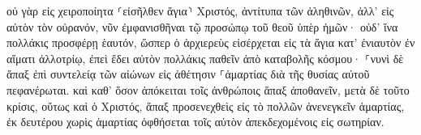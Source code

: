 \documentclass{openreader}
\begin{document}
οὐ γὰρ εἰς χειροποίητα ⸂εἰσῆλθεν ἅγια⸃ Χριστός, ἀντίτυπα τῶν ἀληθινῶν, ἀλλ’ εἰς αὐτὸν τὸν οὐρανόν, νῦν ἐμφανισθῆναι τῷ προσώπῳ τοῦ θεοῦ ὑπὲρ ἡμῶν· 
οὐδ’ ἵνα πολλάκις προσφέρῃ ἑαυτόν, ὥσπερ ὁ ἀρχιερεὺς εἰσέρχεται εἰς τὰ ἅγια κατ’ ἐνιαυτὸν ἐν αἵματι ἀλλοτρίῳ, 
ἐπεὶ ἔδει αὐτὸν πολλάκις παθεῖν ἀπὸ καταβολῆς κόσμου· ⸀νυνὶ δὲ ἅπαξ ἐπὶ συντελείᾳ τῶν αἰώνων εἰς ἀθέτησιν ⸀ἁμαρτίας διὰ τῆς θυσίας αὐτοῦ πεφανέρωται. 
καὶ καθ’ ὅσον ἀπόκειται τοῖς ἀνθρώποις ἅπαξ ἀποθανεῖν, μετὰ δὲ τοῦτο κρίσις, 
οὕτως καὶ ὁ Χριστός, ἅπαξ προσενεχθεὶς εἰς τὸ πολλῶν ἀνενεγκεῖν ἁμαρτίας, ἐκ δευτέρου χωρὶς ἁμαρτίας ὀφθήσεται τοῖς αὐτὸν ἀπεκδεχομένοις εἰς σωτηρίαν. 
\end{document}
